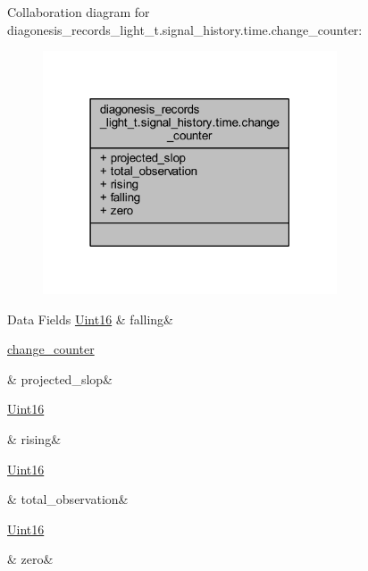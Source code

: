 Collaboration diagram for diagonesis\+\_\+records\+\_\+light\+\_\+t.\+signal\+\_\+history.\+time.\+change\+\_\+counter\+:\nopagebreak
\begin{figure}[H]
\begin{center}
\leavevmode
\includegraphics[width=247pt]{de/d62/a00924}
\end{center}
\end{figure}
\begin{DoxyFields}{Data Fields}
\hypertarget{a00017_a465223d16534b847faf7b88e6cd17139}{\hyperlink{a00072_a59a9f6be4562c327cbfb4f7e8e18f08b}{Uint16}}\label{a00017_a465223d16534b847faf7b88e6cd17139}
&
falling&
\\
\hline

\hypertarget{a00017_acc74bf2ebd52edb83c0853981f563043}{\hyperlink{a00017_d5/d05/a00385}{change\+\_\+counter}}\label{a00017_acc74bf2ebd52edb83c0853981f563043}
&
projected\+\_\+slop&
\\
\hline

\hypertarget{a00017_a637aa1a3f3fe939460e3e6126a3cb76a}{\hyperlink{a00072_a59a9f6be4562c327cbfb4f7e8e18f08b}{Uint16}}\label{a00017_a637aa1a3f3fe939460e3e6126a3cb76a}
&
rising&
\\
\hline

\hypertarget{a00017_a5c752d693b04fadbacceeaffb3adf49a}{\hyperlink{a00072_a59a9f6be4562c327cbfb4f7e8e18f08b}{Uint16}}\label{a00017_a5c752d693b04fadbacceeaffb3adf49a}
&
total\+\_\+observation&
\\
\hline

\hypertarget{a00017_ad02c4c4cde7ae76252540d116a40f23a}{\hyperlink{a00072_a59a9f6be4562c327cbfb4f7e8e18f08b}{Uint16}}\label{a00017_ad02c4c4cde7ae76252540d116a40f23a}
&
zero&
\\
\hline

\end{DoxyFields}
\label{d5/d05/a00385}
\hypertarget{a00017_d5/d05/a00385}{}
